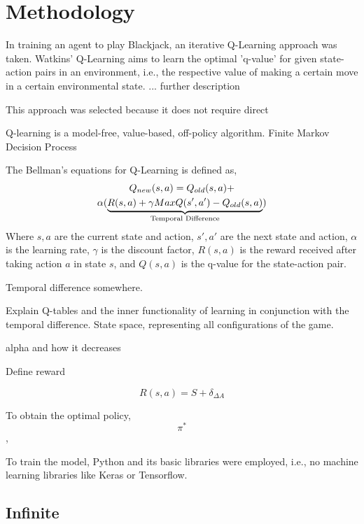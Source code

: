 \section{Methodology}

In training an agent to play Blackjack, an iterative Q-Learning approach was taken. Watkins' Q-Learning aims to learn the optimal 'q-value' for given state-action pairs in an environment, i.e., the respective value of making a certain move in a certain environmental state. ... further description

This approach was selected because it does not require direct 

Q-learning is a model-free, value-based, off-policy algorithm. Finite Markov Decision Process

The Bellman's equations for Q-Learning is defined as,
\begin{multline}
    Q_{new}(s,a)=Q_{old}(s,a)+\\\alpha(\underbrace{R(s,a)+\gamma MaxQ(s',a')-Q_{old}(s,a)}_{\mathclap{\text{Temporal Difference}}})
\end{multline}
Where \( s, a \) are the current state and action,  \( s', a' \) are the next state and action, \( \alpha \) is the learning rate, \( \gamma \) is the discount factor, \( R(s,a) \) is the reward received after taking action \( a \) in state \( s \), and \( Q(s,a) \) is the q-value for the state-action pair. 



Temporal difference somewhere. 

Explain Q-tables and the inner functionality of learning in conjunction with the temporal difference. State space, representing all configurations of the game. 

alpha and how it decreases

Define reward

\begin{equation} \label{reward}
    R(s,a) = S + \delta_{\Delta A}
\end{equation}
    
To obtain the optimal policy, \[\pi^*\], 

To train the model, Python and its basic libraries were employed, i.e., no machine learning libraries like Keras or Tensorflow. 


\subsection{Infinite}

